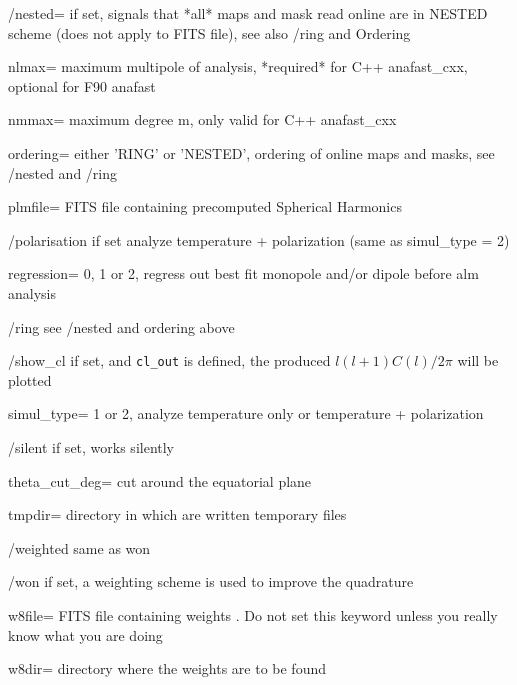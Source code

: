 \begin{keywords}
\begin{kwlist}{}
\item[/nested=] if set, signals that *all* maps and mask read online are in
   NESTED scheme (does not apply to FITS file), see also /ring and Ordering

\item[nlmax=]   maximum multipole of analysis, *required* for C++ anafast\_cxx,
      optional for F90 anafast

\item[nmmax=]   maximum degree m, only valid for C++ anafast\_cxx 

\item[ordering=] either 'RING' or 'NESTED', ordering of online maps and masks,
 see /nested and /ring

\item[plmfile=] FITS file containing precomputed Spherical Harmonics 

\item[/polarisation] if set analyze temperature + polarization (same as simul\_type = 2)

\item[regression=] 0, 1 or 2, regress out best fit monopole and/or dipole before
    alm analysis

\item[/ring] see /nested and ordering above

\item[/show\_cl] if set, and {\tt cl\_out} is defined, the produced $l (l+1) C(l)/2\pi$ will
be plotted

\item[simul\_type=] 1 or 2, analyze temperature only or temperature + polarization

\item[/silent]    if set, works silently

\item[theta\_cut\_deg=] cut around the equatorial plane 

\item[tmpdir=]      directory in which are written temporary files 

\item[/weighted]     same as won

\item[/won]     if set, a weighting scheme is used to improve the quadrature

\item[w8file=]    FITS file containing weights 
     .
   Do not set this keyword unless you really know what you are doing

\item[w8dir=]     directory where the weights are to be found 

  \end{kwlist}
\end{keywords}  

